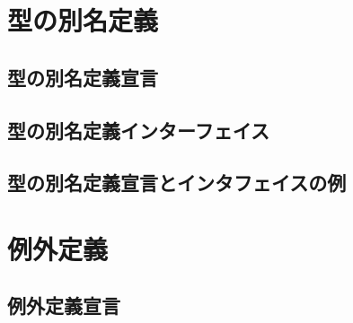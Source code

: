 \documentclass{jbook}
\newif\ifjp
\newcommand{\txt}[2]{#1}
\begin{document}
\section{\txt{型の別名定義}{}}
\ifjp%
\else%
\fi%

\subsection{\txt{型の別名定義宣言}{}}
\ifjp%
\else%
\fi%

\subsection{\txt{型の別名定義インターフェイス}{}}
\ifjp%
\else%
\fi%

\subsection{\txt{型の別名定義宣言とインタフェイスの例}{}}
\ifjp%
\else%
\fi%

\section{\txt{例外定義}{}}
\ifjp%
\else%
\fi%

\subsection{\txt{例外定義宣言}{}}
\ifjp%
\else%
\fi%
\end{document}
